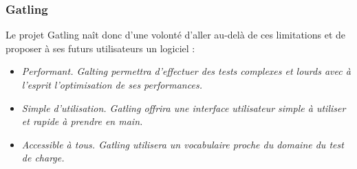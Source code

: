 \subsubsection{Gatling}
Le projet Gatling naît donc d'une volonté d'aller au-delà de ces limitations et de proposer à ses futurs utilisateurs un logiciel :
\begin{itemize}
  \item \em{Performant}. Galting permettra d'effectuer des tests complexes et lourds avec à l'esprit l'optimisation de ses performances.
  \item \em{Simple d'utilisation}. Gatling offrira une interface utilisateur simple à utiliser et rapide à prendre en main.
  \item \em{Accessible à tous}. Gatling utilisera un vocabulaire proche du domaine du test de charge.
\end{itemize}
